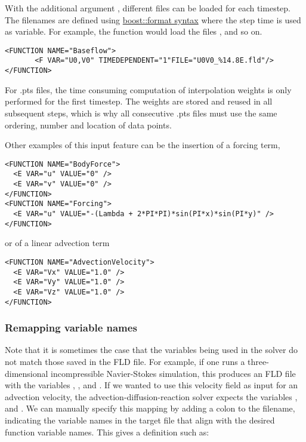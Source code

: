 With the additional argument , different files can be
loaded for each timestep. The filenames are defined using
\href{http://www.boost.org/doc/libs/1_56_0/libs/format/doc/format.html#syntax}{boost::format syntax}
where the step time is used as variable. For example, the function
 would load the files ,
 and so on.

\begin{lstlisting}[style=XMLStyle]
<FUNCTION NAME="Baseflow">
       <F VAR="U0,V0" TIMEDEPENDENT="1"FILE="U0V0_%14.8E.fld"/>
</FUNCTION>
\end{lstlisting}

For .pts files, the time consuming computation of interpolation weights is only
performed for the first timestep. The weights are stored and reused in all subsequent steps, 
which is why all consecutive .pts files must use the same ordering, number and location of
data points.

Other examples of this input feature can be the insertion of a forcing term,

\begin{lstlisting}[style=XMLStyle]
<FUNCTION NAME="BodyForce">
  <E VAR="u" VALUE="0" />
  <E VAR="v" VALUE="0" />
</FUNCTION>
<FUNCTION NAME="Forcing">
  <E VAR="u" VALUE="-(Lambda + 2*PI*PI)*sin(PI*x)*sin(PI*y)" />
</FUNCTION>
\end{lstlisting}

or of a linear advection term

\begin{lstlisting}[style=XMLStyle]
<FUNCTION NAME="AdvectionVelocity">
  <E VAR="Vx" VALUE="1.0" />
  <E VAR="Vy" VALUE="1.0" />
  <E VAR="Vz" VALUE="1.0" />
</FUNCTION>
\end{lstlisting}

\subsubsection{Remapping variable names}

Note that it is sometimes the case that the variables being used in the solver
do not match those saved in the FLD file. For example, if one runs a
three-dimensional incompressible Navier-Stokes simulation, this produces an FLD
file with the variables , ,  and . If we
wanted to use this velocity field as input for an advection velocity, the
advection-diffusion-reaction solver expects the variables , 
and . We can manually specify this mapping by adding a colon to the
filename, indicating the variable names in the target file that align with the
desired function variable names. This gives a definition such as:

